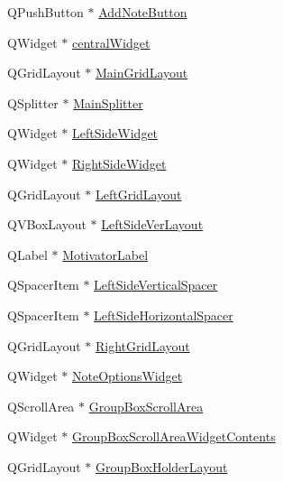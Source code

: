 \begin{DoxyCompactItemize}
\item 
Q\+Push\+Button $\ast$ \hyperlink{class_matty_notes_main_window_aeb4fd769ffeac425a43abc16708b6dc1}{Add\+Note\+Button}
\item 
Q\+Widget $\ast$ \hyperlink{class_matty_notes_main_window_a590b111444099a56cdd6ee7876f38521}{central\+Widget}
\item 
Q\+Grid\+Layout $\ast$ \hyperlink{class_matty_notes_main_window_a8d6b99e6a4b055ac1e27bcced0dbdbcf}{Main\+Grid\+Layout}
\item 
Q\+Splitter $\ast$ \hyperlink{class_matty_notes_main_window_a23bccec30dacb989e0e86c20e3afd037}{Main\+Splitter}
\item 
Q\+Widget $\ast$ \hyperlink{class_matty_notes_main_window_adc593268179cbf4d75170b3b3ce02843}{Left\+Side\+Widget}
\item 
Q\+Widget $\ast$ \hyperlink{class_matty_notes_main_window_a996c73ff73f44e875ce48192db687abb}{Right\+Side\+Widget}
\item 
Q\+Grid\+Layout $\ast$ \hyperlink{class_matty_notes_main_window_aaba04f791304a6ccca1c96bef35b52d6}{Left\+Grid\+Layout}
\item 
Q\+V\+Box\+Layout $\ast$ \hyperlink{class_matty_notes_main_window_a4f9dc9be365bc7f2565f0c50c9a11be5}{Left\+Side\+Ver\+Layout}
\item 
Q\+Label $\ast$ \hyperlink{class_matty_notes_main_window_ad4910860415073b4d8c59190807800ba}{Motivator\+Label}
\item 
Q\+Spacer\+Item $\ast$ \hyperlink{class_matty_notes_main_window_ab70a06df9c479aa5e6d0a3e8f8b266e1}{Left\+Side\+Vertical\+Spacer}
\item 
Q\+Spacer\+Item $\ast$ \hyperlink{class_matty_notes_main_window_ae4d4ea6fec42e10eab167f457116fdf0}{Left\+Side\+Horizontal\+Spacer}
\item 
Q\+Grid\+Layout $\ast$ \hyperlink{class_matty_notes_main_window_af5caef9487e095083f52c4989e1af926}{Right\+Grid\+Layout}
\item 
Q\+Widget $\ast$ \hyperlink{class_matty_notes_main_window_aa98524af7077eef16ba0529e5175f994}{Note\+Options\+Widget}
\item 
Q\+Scroll\+Area $\ast$ \hyperlink{class_matty_notes_main_window_a86b43b5faf9df668013aa95be9be54f5}{Group\+Box\+Scroll\+Area}
\item 
Q\+Widget $\ast$ \hyperlink{class_matty_notes_main_window_aa494ff6b293445e08b9a706938536450}{Group\+Box\+Scroll\+Area\+Widget\+Contents}
\item 
Q\+Grid\+Layout $\ast$ \hyperlink{class_matty_notes_main_window_ad0fc70c3a6eb0d3ac31518dd7350d21c}{Group\+Box\+Holder\+Layout}

\end{DoxyCompactItemize}
